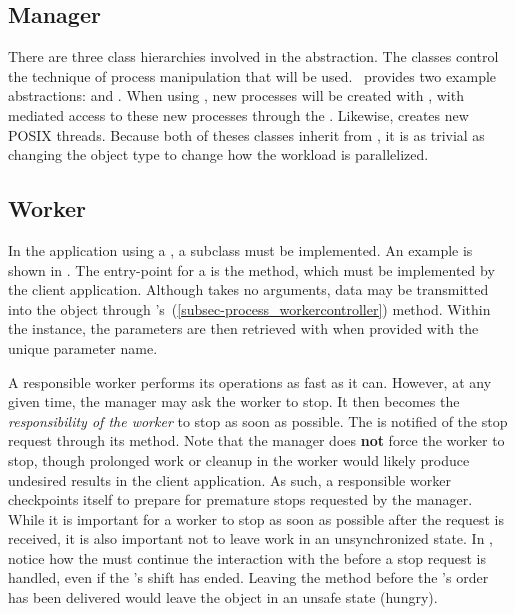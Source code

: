 \subsection{Manager}
\label{subsec-process_manager}

There are three class hierarchies involved in the abstraction.  
The  classes control the
technique of process manipulation that will be used.  \sname\ provides two
example abstractions:  and
.  When
using , new processes will be created with 
, with mediated access to these new processes through the
.  Likewise, 
creates new POSIX threads.  Because both of theses classes inherit from
, it is as trivial as changing the  object type
to change how the workload is parallelized.

\subsection{Worker}
\label{subsec-process_worker}

In the application using a , a  subclass must be
implemented.  An example  is shown in
.
The entry-point for a  is the 
method, which must be implemented by the client application.  Although
 takes no arguments, data may be transmitted
into the object through
's~(\ref{subsec-process_workercontroller})
 method.  Within the  instance,
the parameters are then retrieved with  when
provided with the unique parameter name.

A responsible worker performs its operations as fast as it can.
However, at any given time, the manager may ask the worker to
stop.  It then becomes the {\em responsibility of the worker} to 
stop as soon as possible.  The  is notified of the stop request
through its  method.  Note that the
manager does \textbf{not} force the worker to stop, though
prolonged work or cleanup in the worker would likely produce
undesired results in the client application.  As such, a responsible
worker checkpoints itself to prepare for premature stops requested by
the manager. While it is important for a worker to stop as soon
as possible after the request is received, it is also important not to leave
work in an unsynchronized state.  In ,
notice how
the  must continue the interaction with the 
before a stop request is handled, even if the 's shift has
ended.  Leaving the method before the 's order has been
delivered would leave the  object in an unsafe state (hungry). 

